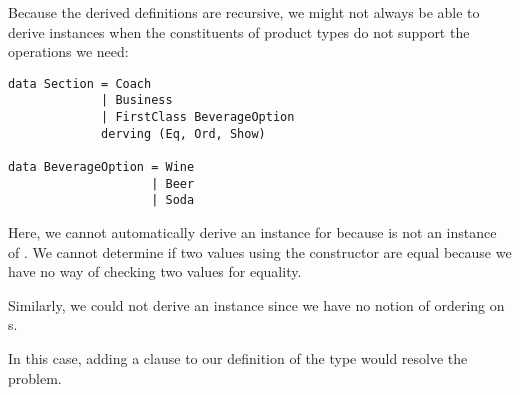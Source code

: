 Because the derived definitions are recursive, we might not always be able to derive instances
when the constituents of product types do not support the operations we need:

\begin{lstlisting}
data Section = Coach
             | Business
             | FirstClass BeverageOption
             derving (Eq, Ord, Show)

data BeverageOption = Wine
                    | Beer
                    | Soda
\end{lstlisting}

\begin{notelist}
    \item Here, we cannot automatically derive an  instance for  because 
           is not an instance of . We cannot determine if two
          values using the  constructor are equal because we have no way of
          checking two  values for equality.
    \item Similarly, we could not derive an  instance since we have no notion of
          ordering on s.
    \item In this case, adding a  clause to our definition of the
           type would resolve the problem.
\end{notelist}
